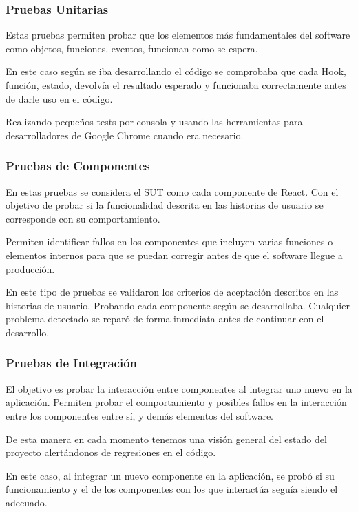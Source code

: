 \documentclass[12pt,twoside,titlepage]{report}
\begin{document}
\subsubsection{Pruebas Unitarias}

Estas pruebas permiten probar que los elementos más fundamentales del software como objetos, funciones, eventos, funcionan como se espera. 

En este caso según se iba desarrollando el código se comprobaba que cada Hook, función, estado, devolvía el resultado esperado y funcionaba correctamente antes de darle uso en el código. 

Realizando pequeños tests por consola y usando las herramientas para desarrolladores de Google Chrome cuando era necesario.

\subsubsection{Pruebas de Componentes}

En estas pruebas se considera el SUT como cada componente de React. Con el objetivo de probar si la funcionalidad descrita en las historias de usuario se corresponde con su comportamiento.

Permiten identificar fallos en los componentes que incluyen varias funciones o elementos internos para que se puedan corregir antes de que el software llegue a producción. 

En este tipo de pruebas se validaron los criterios de aceptación descritos en las historias de usuario. Probando cada componente según se desarrollaba. Cualquier problema detectado se reparó de forma inmediata antes de continuar con el desarrollo.

\subsubsection{Pruebas de Integración}

El objetivo es probar la interacción entre componentes al integrar uno nuevo en la aplicación. Permiten probar el comportamiento y posibles fallos en la interacción entre los componentes entre sí, y demás elementos del software.

De esta manera en cada momento tenemos una visión general del estado del proyecto alertándonos de regresiones en el código.

En este caso, al integrar un nuevo componente en la aplicación, se probó si su funcionamiento y el de los componentes con los que interactúa seguía siendo el adecuado.
\end{document}
